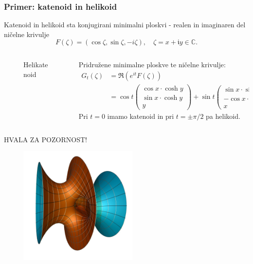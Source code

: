 \documentclass[8pt]{beamer}
\theoremstyle{definition}
\theoremstyle{remark}
\theoremstyle{plain}
\numberwithin{equation}{section}  %
\begin{document}
\begin{frame}
    \frametitle{Primer: katenoid in helikoid}

    Katenoid in helikoid sta konjugirani minimalni ploskvi - realen in imaginaren del ničelne krivulje 
    \begin{equation*}
        F(\zeta)=(\cos \zeta, \sin \zeta,-i \zeta), \quad \zeta=x+\mathfrak{i} y \in \mathbb{C}.
    \end{equation*}
    \pause
    \begin{columns}
        \begin{column}{0.37\textwidth}
            \begin{figure}
                \centering
                \caption{Helikatenoid}
            \end{figure}
        \end{column}
        
        \begin{column}{0.63\textwidth}
            Pridružene minimalne ploskve te ničelne krivulje:
            \begin{align*}
                G_t(\zeta) & =\Re\left(e^{i t} F(\zeta)\right) \\
                & =\cos t\begin{pmatrix}
                \cos x \cdot \cosh y \\
                \sin x \cdot \cosh y \\
                y
                \end{pmatrix}+\sin t\begin{pmatrix}
                \sin x \cdot \sinh y \\
                -\cos x \cdot \sinh y \\
                x
                \end{pmatrix}
            \end{align*}
            Pri $t=0$ imamo katenoid in pri $t= \pm \pi / 2$ pa helikoid. 
            \vspace{6em}
        \end{column}
    \end{columns}
    
\end{frame}

\begin{frame}
    \begin{center}
        \LARGE \textcolor{red1}{HVALA ZA POZORNOST!}

        \centering
        \begin{figure}
            \includegraphics[width=16em]{../Slike/Costa_Minimal_Surface.jpg}
        \end{figure}
    \end{center}

\end{frame}
\end{document}
